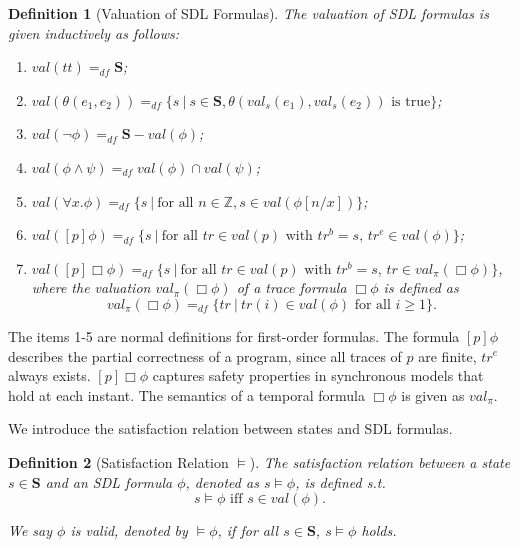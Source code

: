 \documentclass{fcs}
\newtheorem{mydef}{Definition}[section]
\newcommand{\bff}[1]{\mathbf{#1}}
\newcommand{\mbb}[1]{\mathbb{#1}}
\newcommand{\true}[0]{\mathit{tt}}
\newcommand{\val}[0]{\mathit{val}}
\newcommand{\dddef}[0]{=_{df}}
\begin{document}
\begin{mydef}[Valuation of SDL Formulas]
    \label{def:Valuation of sDTL Formulas}
    The valuation of SDL formulas is given inductively as follows:
    \begin{enumerate}
        \item $\val(\true)\dddef \bff{S}$;
        \item $\val(\theta(e_1, e_2))\dddef \{s\ |\ s\in \bff{S}, \theta(\val_s(e_1), \val_s(e_2))\mbox{ is true}\}$;
        \item $\val(\neg \phi)\dddef \bff{S} - \val(\phi)$;
        \item $\val(\phi\wedge \psi)\dddef \val(\phi)\cap \val(\psi)$;
        \item $\val(\forall x. \phi)\dddef \{s\ |\ \mbox{for all }n\in \mbb{Z}, s\in \val(\phi[n/x])\}$;
        \item $\val([p]\phi)\dddef \{s\ |\ \mbox{for all $tr\in \val(p)$ with $tr^b = s$, $tr^e\in \val(\phi)$}\}$;
        \item $\val([p]\Box\phi)\dddef \{s\ |\ \mbox{for all $tr\in \val(p)$ with $tr^b=s$, $tr\in \val_\pi(\Box\phi)$}\}$, where the valuation $\val_\pi(\Box\phi)$ of a trace formula $\Box\phi$ is defined as
    $$\val_\pi(\Box\phi)\dddef \{tr\ |\ tr(i)\in \val(\phi)\mbox{ for all $i\ge 1$}\}.$$
    \end{enumerate}
\end{mydef}

The items 1-5 are normal definitions for first-order formulas.
The formula $[p]\phi$ describes the partial correctness of a program, since all traces of $p$ are finite, $tr^e$ always exists.
$[p]\Box\phi$ %
captures safety properties in synchronous models that hold at each instant.
The semantics of a temporal formula $\Box\phi$ is given as $\val_\pi$.

We introduce the satisfaction relation between states and SDL formulas.

\begin{mydef}[Satisfaction Relation $\models$]
\label{def:Satisfaction Relation}
    The satisfaction relation between a state $s\in \bff{S}$ and an SDL formula $\phi$, denoted as $s\models \phi$, is defined s.t.
    $$\mbox{$s\models \phi$ iff $s\in \val(\phi)$}.$$

    We say $\phi$ is valid, denoted by $\models \phi$, if for all $s\in \bff{S}$, $s\models \phi$ holds.
\end{mydef}
\end{document}
